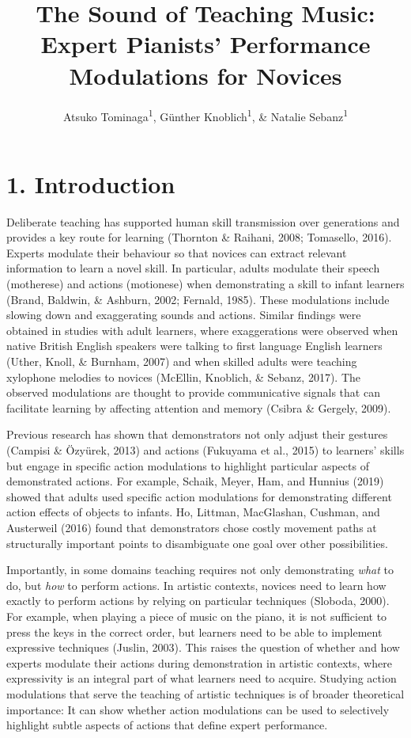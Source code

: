 \documentclass[
  english,
  man,floatsintext]{apa6}
\author{Atsuko Tominaga\textsuperscript{1}, Günther Knoblich\textsuperscript{1}, \& Natalie Sebanz\textsuperscript{1}}
\affiliation{
\vspace{0.5cm}
\textsuperscript{1} Department of Cognitive Science, Central European University}
\title{The Sound of Teaching Music: Expert Pianists' Performance Modulations for Novices}
\date{}
\begin{document}
\maketitle

\hypertarget{introduction}{%
\section{1. Introduction}\label{introduction}}

Deliberate teaching has supported human skill transmission over generations and provides a key route for learning (Thornton \& Raihani, 2008; Tomasello, 2016). Experts modulate their behaviour so that novices can extract relevant information to learn a novel skill. In particular, adults modulate their speech (motherese) and actions (motionese) when demonstrating a skill to infant learners (Brand, Baldwin, \& Ashburn, 2002; Fernald, 1985). These modulations include slowing down and exaggerating sounds and actions. Similar findings were obtained in studies with adult learners, where exaggerations were observed when native British English speakers were talking to first language English learners (Uther, Knoll, \& Burnham, 2007) and when skilled adults were teaching xylophone melodies to novices (McEllin, Knoblich, \& Sebanz, 2017). The observed modulations are thought to provide communicative signals that can facilitate learning by affecting attention and memory (Csibra \& Gergely, 2009).

Previous research has shown that demonstrators not only adjust their gestures (Campisi \& Özyürek, 2013) and actions (Fukuyama et al., 2015) to learners' skills but engage in specific action modulations to highlight particular aspects of demonstrated actions. For example, Schaik, Meyer, Ham, and Hunnius (2019) showed that adults used specific action modulations for demonstrating different action effects of objects to infants. Ho, Littman, MacGlashan, Cushman, and Austerweil (2016) found that demonstrators chose costly movement paths at structurally important points to disambiguate one goal over other possibilities.

Importantly, in some domains teaching requires not only demonstrating \emph{what} to do, but \emph{how} to perform actions. In artistic contexts, novices need to learn how exactly to perform actions by relying on particular techniques (Sloboda, 2000). For example, when playing a piece of music on the piano, it is not sufficient to press the keys in the correct order, but learners need to be able to implement expressive techniques (Juslin, 2003). This raises the question of whether and how experts modulate their actions during demonstration in artistic contexts, where expressivity is an integral part of what learners need to acquire. Studying action modulations that serve the teaching of artistic techniques is of broader theoretical importance: It can show whether action modulations can be used to selectively highlight subtle aspects of actions that define expert performance.
\end{document}
